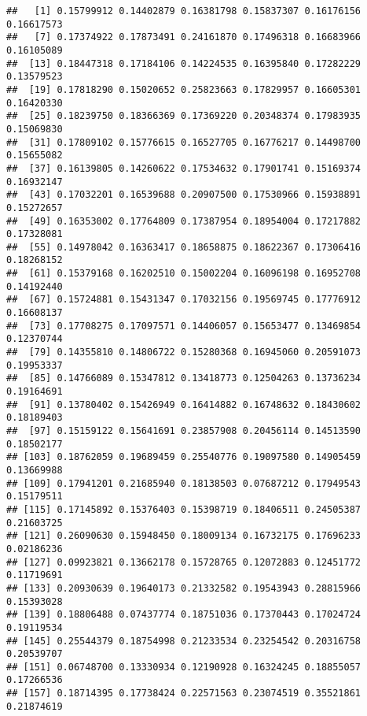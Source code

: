 \documentclass[
]{article}
\newenvironment{Shaded}{\begin{snugshade}}{\end{snugshade}}
\newcommand{\DataTypeTok}[1]{\textcolor[rgb]{0.13,0.29,0.53}{#1}}
\newcommand{\DecValTok}[1]{\textcolor[rgb]{0.00,0.00,0.81}{#1}}
\newcommand{\KeywordTok}[1]{\textcolor[rgb]{0.13,0.29,0.53}{\textbf{#1}}}
\newcommand{\NormalTok}[1]{#1}
\newcommand{\OperatorTok}[1]{\textcolor[rgb]{0.81,0.36,0.00}{\textbf{#1}}}
\newcommand{\StringTok}[1]{\textcolor[rgb]{0.31,0.60,0.02}{#1}}
\begin{document}
\begin{Shaded}
\end{Shaded}

\begin{verbatim}
##   [1] 0.15799912 0.14402879 0.16381798 0.15837307 0.16176156 0.16617573
##   [7] 0.17374922 0.17873491 0.24161870 0.17496318 0.16683966 0.16105089
##  [13] 0.18447318 0.17184106 0.14224535 0.16395840 0.17282229 0.13579523
##  [19] 0.17818290 0.15020652 0.25823663 0.17829957 0.16605301 0.16420330
##  [25] 0.18239750 0.18366369 0.17369220 0.20348374 0.17983935 0.15069830
##  [31] 0.17809102 0.15776615 0.16527705 0.16776217 0.14498700 0.15655082
##  [37] 0.16139805 0.14260622 0.17534632 0.17901741 0.15169374 0.16932147
##  [43] 0.17032201 0.16539688 0.20907500 0.17530966 0.15938891 0.15272657
##  [49] 0.16353002 0.17764809 0.17387954 0.18954004 0.17217882 0.17328081
##  [55] 0.14978042 0.16363417 0.18658875 0.18622367 0.17306416 0.18268152
##  [61] 0.15379168 0.16202510 0.15002204 0.16096198 0.16952708 0.14192440
##  [67] 0.15724881 0.15431347 0.17032156 0.19569745 0.17776912 0.16608137
##  [73] 0.17708275 0.17097571 0.14406057 0.15653477 0.13469854 0.12370744
##  [79] 0.14355810 0.14806722 0.15280368 0.16945060 0.20591073 0.19953337
##  [85] 0.14766089 0.15347812 0.13418773 0.12504263 0.13736234 0.19164691
##  [91] 0.13780402 0.15426949 0.16414882 0.16748632 0.18430602 0.18189403
##  [97] 0.15159122 0.15641691 0.23857908 0.20456114 0.14513590 0.18502177
## [103] 0.18762059 0.19689459 0.25540776 0.19097580 0.14905459 0.13669988
## [109] 0.17941201 0.21685940 0.18138503 0.07687212 0.17949543 0.15179511
## [115] 0.17145892 0.15376403 0.15398719 0.18406511 0.24505387 0.21603725
## [121] 0.26090630 0.15948450 0.18009134 0.16732175 0.17696233 0.02186236
## [127] 0.09923821 0.13662178 0.15728765 0.12072883 0.12451772 0.11719691
## [133] 0.20930639 0.19640173 0.21332582 0.19543943 0.28815966 0.15393028
## [139] 0.18806488 0.07437774 0.18751036 0.17370443 0.17024724 0.19119534
## [145] 0.25544379 0.18754998 0.21233534 0.23254542 0.20316758 0.20539707
## [151] 0.06748700 0.13330934 0.12190928 0.16324245 0.18855057 0.17266536
## [157] 0.18714395 0.17738424 0.22571563 0.23074519 0.35521861 0.21874619

\end{verbatim}
\end{document}
